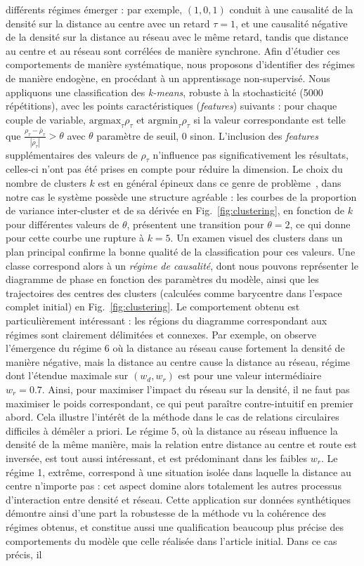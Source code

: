 \documentclass[french]{./sageo}
\begin{document}
différents régimes émerger : par exemple, $(1,0,1)$ conduit à une causalité de la densité sur la distance au centre avec un retard $\tau=1$, et une causalité négative de la densité sur la distance au réseau avec le même retard, tandis que distance au centre et au réseau sont corrélées de manière synchrone. Afin d'étudier ces comportements de manière systématique, nous proposons d'identifier des régimes de manière endogène, en procédant à un apprentissage non-supervisé. Nous appliquons une classification des \emph{k-means}, robuste à la stochasticité (5000 répétitions), avec les points caractéristiques (\emph{features}) suivants : pour chaque couple de variable, $\textrm{argmax}_{\tau} \rho_{\tau}$ et $\textrm{argmin}_{\tau} \rho_{\tau}$ si la valeur correspondante est telle que $\frac{\rho_{\tau}-\bar{\rho}_{\tau}}{\left|\bar{\rho}_{\tau}\right|} > \theta$ avec $\theta$ paramètre de seuil, 0 sinon. L'inclusion des \emph{features} supplémentaires des valeurs de $\rho_{\tau}$ n'influence pas significativement les résultats, celles-ci n'ont pas été prises en compte pour réduire la dimension. Le choix du nombre de clusters $k$ est en général épineux dans ce genre de problème~\cite{hamerly2003learning}, dans notre cas le système possède une structure agréable : les courbes de la proportion de variance inter-cluster et de sa dérivée en Fig.~\ref{fig:clustering}, en fonction de $k$ pour différentes valeurs de $\theta$, présentent une transition pour $\theta = 2$, ce qui donne pour cette courbe une rupture à $k=5$. Un examen visuel des clusters dans un plan principal confirme la bonne qualité de la classification pour ces valeurs. Une classe correspond alors à un \emph{régime de causalité}, dont nous pouvons représenter le diagramme de phase en fonction des paramètres du modèle, ainsi que les trajectoires des centres des clusters (calculées comme barycentre dans l'espace complet initial) en Fig.~\ref{fig:clustering}. Le comportement obtenu est particulièrement intéressant : les régions du diagramme correspondant aux régimes sont clairement délimitées et connexes. Par exemple, on observe l'émergence du régime 6 où la distance au réseau cause fortement la densité de manière négative, mais la distance au centre cause la distance au réseau, régime dont l'étendue maximale sur $(w_d,w_r)$ est pour une valeur intermédiaire $w_r=0.7$. Ainsi, pour maximiser l'impact du réseau sur la densité, il ne faut pas maximiser le poids correspondant, ce qui peut paraître contre-intuitif en premier abord. Cela illustre l'intérêt de la méthode dans le cas de relations circulaires difficiles à démêler a priori. Le régime 5, où la distance au réseau influence la densité de la même manière, mais la relation entre distance au centre et route est inversée, est tout aussi intéressant, et est prédominant dans les faibles $w_r$. Le régime 1, extrême, correspond à une situation isolée dans laquelle la distance au centre n'importe pas : cet aspect domine alors totalement les autres processus d'interaction entre densité et réseau. Cette application sur données synthétiques démontre ainsi d'une part la robustesse de la méthode vu la cohérence des régimes obtenus, et constitue aussi une qualification beaucoup plus précise des comportements du modèle que celle réalisée dans l'article initial. Dans ce cas précis, il 
\end{document}
